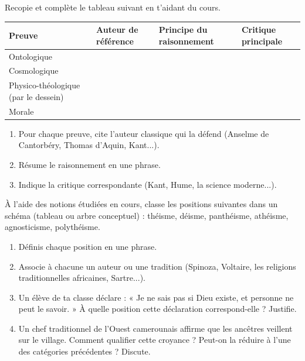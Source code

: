 \documentclass[11pt]{article}
\newcounter{popsec}
\newcounter{popsub}
\newcommand{\courssub}[1]{%
  \stepcounter{popsub}%
  \par\vspace{9pt}\noindent{\popxbold\fontsize{11.5}{13}\selectfont\color{popink}{\color{poporange}\thepopsec.\thepopsub}\hspace{6pt}#1}\par\nopagebreak\vspace{4pt}
}
\begin{document}
\courssub{Je m'entraîne}

\begin{exercice}
Recopie et complète le tableau suivant en t'aidant du cours.

\begin{center}
\begin{tabularx}{\linewidth}{|l|X|X|X|}
\hline
\rowcolor{popblueL} \textbf{Preuve} & \textbf{Auteur de référence} & \textbf{Principe du raisonnement} & \textbf{Critique principale} \\
\hline
Ontologique & & & \\
\hline
Cosmologique & & & \\
\hline
Physico-théologique (par le dessein) & & & \\
\hline
Morale & & & \\
\hline
\end{tabularx}
\end{center}

\begin{enumerate}
\item Pour chaque preuve, cite l'auteur classique qui la défend (Anselme de Cantorbéry, Thomas d'Aquin, Kant...).
\item Résume le raisonnement en une phrase.
\item Indique la critique correspondante (Kant, Hume, la science moderne...).
\end{enumerate}
\end{exercice}

\begin{exercice}
À l'aide des notions étudiées en cours, classe les positions suivantes dans un schéma (tableau ou arbre conceptuel) : théisme, déisme, panthéisme, athéisme, agnosticisme, polythéisme.
\begin{enumerate}
\item Définis chaque position en une phrase.
\item Associe à chacune un auteur ou une tradition (Spinoza, Voltaire, les religions traditionnelles africaines, Sartre...).
\item Un élève de ta classe déclare : « Je ne sais pas si Dieu existe, et personne ne peut le savoir. » À quelle position cette déclaration correspond-elle ? Justifie.
\item Un chef traditionnel de l'Ouest camerounais affirme que les ancêtres veillent sur le village. Comment qualifier cette croyance ? Peut-on la réduire à l'une des catégories précédentes ? Discute.
\end{enumerate}
\end{exercice}
\end{document}
